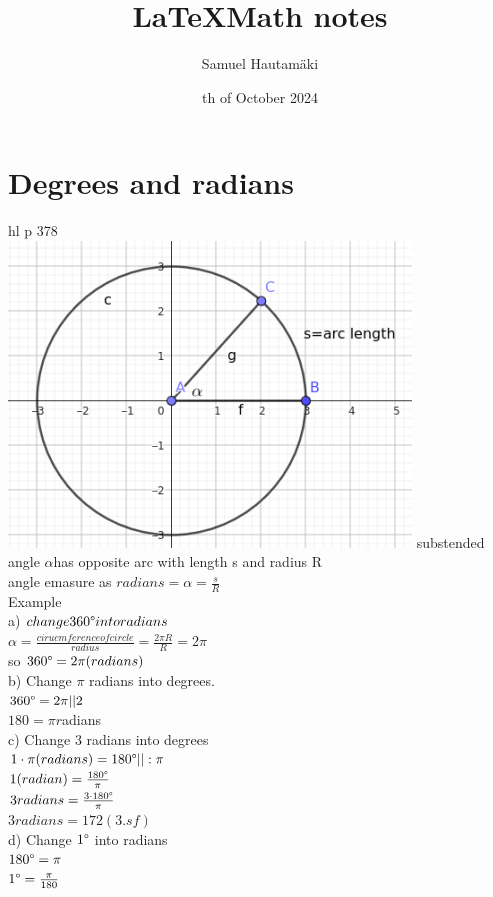 \documentclass{article}
\title{\LaTeX Math notes}
\author{Samuel Hautamäki}
\date{th of October 2024}
\begin{document}
  \maketitle
   
  \section{Degrees and radians}
  hl p 378\\
  \includegraphics{arclength.png}
  substended angle $\alpha $has opposite arc with length s and radius R\\
  angle emasure as $radians=\alpha=\frac{s}{R}$\\
  Example\\
  a) $change 360\degree into radians$\\
  $\alpha=\frac{cirucmference of circle}{radius}=\frac{2\pi R}{R}=2\pi$\\ 
  so $360\degree=2\pi (radians)$\\
  b) Change $\pi$ radians into degrees.\\
  $360\degree=2\pi ||2$\\
  $180=\pi r$adians\\
  c) Change 3 radians into degrees\\
  $1\cdot\pi(radians)=180\degree ||:\pi$\\
  $1(radian)=\frac{180\degree}{\pi}$\\
  $3 radians =\frac{3\cdot180\degree}{\pi}$\\
  $3 radians= 172 (3.sf)$\\
  d) Change $1\degree$ into radians\\
  $180\degree=\pi$\\
  $1\degree=\frac{\pi}{180}$\\
\end{document}
